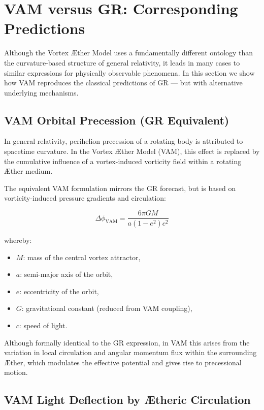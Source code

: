 \section{VAM versus GR: Corresponding Predictions}
\label{sec:vam-versus-gr-corresponding-predictions}

Although the Vortex Æther Model uses a fundamentally different ontology than the curvature-based structure of general relativity, it leads in many cases to similar expressions for physically observable phenomena. In this section we show how VAM reproduces the classical predictions of GR — but with alternative underlying mechanisms.

\subsection*{VAM Orbital Precession (GR Equivalent)}

In general relativity, perihelion precession of a rotating body is attributed to spacetime curvature. In the Vortex Æther Model (VAM), this effect is replaced by the cumulative influence of a vortex-induced vorticity field within a rotating Æther medium.

The equivalent VAM formulation mirrors the GR forecast, but is based on vorticity-induced pressure gradients and circulation:

\begin{equation}
    \Delta\phi_\text{VAM} =
    \frac{6\pi G M}{a(1 - e^2) c^2}
\end{equation}

whereby:
\begin{itemize}
    \item \( M \): mass of the central vortex attractor,
    \item \( a \): semi-major axis of the orbit,
    \item \( e \): eccentricity of the orbit,
    \item \( G \): gravitational constant (reduced from VAM coupling),
    \item \( c \): speed of light.
\end{itemize}
Although formally identical to the GR expression, in VAM this arises from the variation in local circulation and angular momentum flux within the surrounding Æther, which modulates the effective potential and gives rise to precessional motion.

\subsection*{VAM Light Deflection by Ætheric Circulation}

